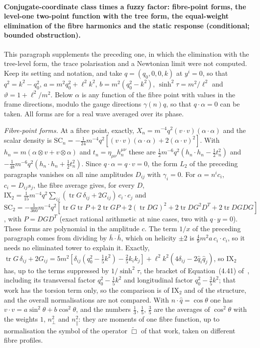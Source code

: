 \paragraph{Conjugate-coordinate class times a fuzzy factor: fibre-point forms, the level-one two-point function with the tree form, the equal-weight elimination of the fibre harmonics and the static response (conditional; bounded obstruction).}
This paragraph supplements the preceding one, in which the elimination with the tree-level form, the trace polarisation and a Newtonian limit were not computed. Keep its setting and notation, and take \(q=(q_0,0,0,k)\) at \(y^i=0\), so that \(q^2=k^2-q_0^2\), \(a=m^2q_0^2+\ell^2k^2\), \(b=m^2(q_0^2-k^2)\), \(\sinh^2\tau=m^2/\ell^2\) and \(\vartheta=1+\ell^2/m^2\). Below \(\alpha\) is any function of the fibre point with values in the frame directions, modulo the gauge directions \(\gamma(n)q\), so that \(q\cdot\alpha=0\) can be taken. All forms are for a real wave averaged over its phase.

\emph{Fibre-point forms.} At a fibre point, exactly, \(X_n=m^{-4}q^2(v\cdot v)(\alpha\cdot\alpha)\) and the scalar density is \(\mathrm{SC}_n=-\tfrac1{24}m^{-4}q^2[(v\cdot v)(\alpha\cdot\alpha)+2(\alpha\cdot v)^2]\). With \(h_n=m(\alpha\otimes v+v\otimes\alpha)\) and \(t_n=\eta_{\mu\nu}h_n^{\mu\nu}\) these are \(\tfrac12m^{-6}q^2(h_n\cdot h_n-\tfrac12t_n^2)\) and \(-\tfrac1{48}m^{-6}q^2(h_n\cdot h_n+\tfrac12t_n^2)\). Since \(q\cdot\alpha=q\cdot v=0\), the form \(L_2\) of the preceding paragraphs vanishes on all nine amplitudes \(D_{ij}\) with \(\gamma_i=0\). For \(\alpha=n^ic_i\), \(c_i=D_{ij}s_j\), the fibre average gives, for every \(D\), \(\mathrm{IX}_2=\tfrac1{15}m^{-4}q^2\sum_{ij}(\operatorname{tr}G\,\delta_{ij}+2G_{ij})\,c_i\cdot c_j\) and \(\mathrm{SC}_2=-\tfrac1{360}m^{-4}q^2[\operatorname{tr}G\operatorname{tr}P+2\operatorname{tr}GP+2(\operatorname{tr}DG)^2+2\operatorname{tr}DG^2D^{T}+2\operatorname{tr}DGDG]\), with \(P=DGD^{T}\) (exact rational arithmetic at nine cases, two with \(q\cdot y=0\)). These forms are polynomial in the amplitude \(c\). The term \(1/x\) of the preceding paragraph comes from dividing by \(\bar h\cdot\bar h\), which on helicity \(\pm2\) is \(\tfrac49m^2a\,c_i\cdot c_i\), so it needs no eliminated tower to explain it. Exactly, \(\operatorname{tr}G\,\delta_{ij}+2G_{ij}=5m^2[\delta_{ij}(q_0^2-\tfrac15k^2)-\tfrac25k_ik_j]+\ell^2k^2(4\delta_{ij}-2\hat q_i\hat q_j)\), so \(\mathrm{IX}_2\) has, up to the terms suppressed by \(1/\sinh^2\tau\), the bracket of Equation~(4.41) of~\cite{Steinacker2026}, including its transversal factor \(q_0^2-\tfrac15k^2\) and longitudinal factor \(q_0^2-\tfrac35k^2\); that work has the torsion term only, so the comparison is of \(\mathrm{IX}_2\) and of the structure, and the overall normalisations are not compared. With \(n\cdot\hat q=\cos\theta\) one has \(v\cdot v=a\sin^2\theta+b\cos^2\theta\), and the numbers \(\tfrac13\), \(\tfrac15\), \(\tfrac35\) are the averages of \(\cos^2\theta\) with the weights \(1\), \(n_\perp^2\) and \(n_\parallel^2\): they are moments of one fibre function, up to normalisation the symbol of the operator \(\tilde\Box\) of that work, taken on different fibre profiles.

